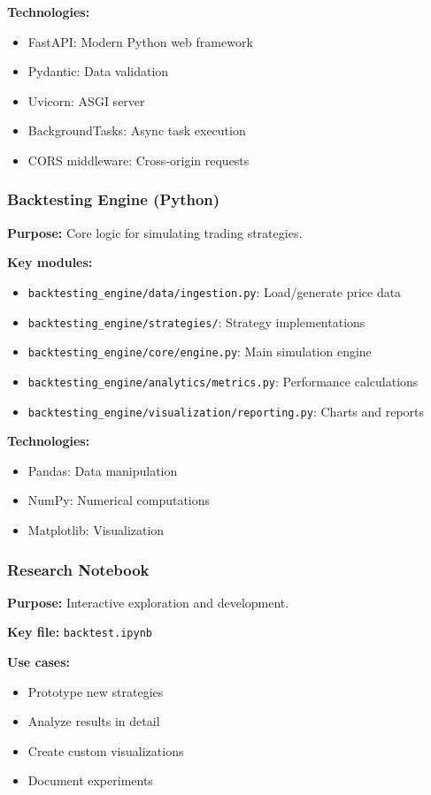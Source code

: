 \documentclass[11pt,a4paper]{article}
\begin{document}
\textbf{Technologies:}
\begin{itemize}
  \item FastAPI: Modern Python web framework
  \item Pydantic: Data validation
  \item Uvicorn: ASGI server
  \item BackgroundTasks: Async task execution
  \item CORS middleware: Cross-origin requests
\end{itemize}

\subsubsection{Backtesting Engine (Python)}

\textbf{Purpose:} Core logic for simulating trading strategies.

\textbf{Key modules:}
\begin{itemize}
  \item \texttt{backtesting\_engine/data/ingestion.py}: Load/generate price data
  \item \texttt{backtesting\_engine/strategies/}: Strategy implementations
  \item \texttt{backtesting\_engine/core/engine.py}: Main simulation engine
  \item \texttt{backtesting\_engine/analytics/metrics.py}: Performance calculations
  \item \texttt{backtesting\_engine/visualization/reporting.py}: Charts and reports
\end{itemize}

\textbf{Technologies:}
\begin{itemize}
  \item Pandas: Data manipulation
  \item NumPy: Numerical computations
  \item Matplotlib: Visualization
\end{itemize}

\subsubsection{Research Notebook}

\textbf{Purpose:} Interactive exploration and development.

\textbf{Key file:} \texttt{backtest.ipynb}

\textbf{Use cases:}
\begin{itemize}
  \item Prototype new strategies
  \item Analyze results in detail
  \item Create custom visualizations
  \item Document experiments
\end{itemize}
\end{document}
